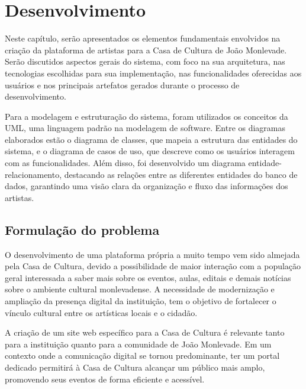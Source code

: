 \chapter{Desenvolvimento}
\label{cap:desenvolvimento}
Neste capítulo, serão apresentados os elementos fundamentais envolvidos na criação da plataforma de artistas para a Casa de Cultura de João Monlevade. Serão discutidos aspectos gerais do sistema, com foco na sua arquitetura, nas tecnologias escolhidas para sua implementação, nas funcionalidades oferecidas aos usuários e nos principais artefatos gerados durante o processo de desenvolvimento.

Para a modelagem e estruturação do sistema, foram utilizados os conceitos da UML, uma linguagem padrão na modelagem de software. Entre os diagramas elaborados estão o diagrama de classes, que mapeia a estrutura das entidades do sistema, e o diagrama de casos de uso, que descreve como os usuários interagem com as funcionalidades. Além disso, foi desenvolvido um diagrama entidade-relacionamento, destacando as relações entre as diferentes entidades do banco de dados, garantindo uma visão clara da organização e fluxo das informações dos artistas.

\section{Formulação do problema}

O desenvolvimento de uma plataforma própria a muito tempo vem sido almejada pela Casa de Cultura, devido a possibilidade de maior interação com a população geral interessada a saber mais sobre os eventos, aulas, editais e demais notícias sobre o ambiente cultural monlevadense. A necessidade de modernização e ampliação da presença digital da instituição, tem o objetivo de fortalecer o vínculo cultural entre os artísticas locais e o cidadão.

A criação de um site web específico para a Casa de Cultura é relevante tanto para a instituição quanto para a comunidade de João Monlevade. Em um contexto onde a comunicação digital se tornou predominante, ter um portal dedicado permitirá à Casa de Cultura alcançar um público mais amplo, promovendo seus eventos de forma eficiente e acessível. 


